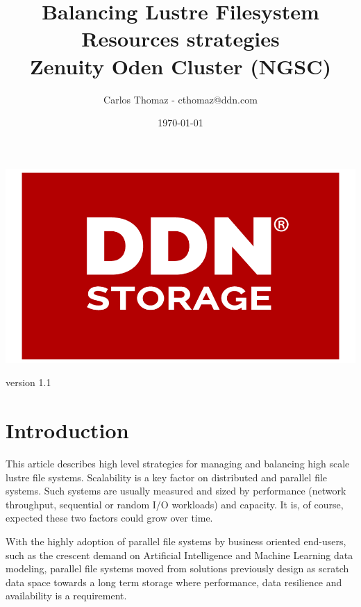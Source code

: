 \documentclass{article}
\title{%
Balancing Lustre Filesystem Resources strategies \\
\large Zenuity Oden Cluster (NGSC)}
\author{Carlos Thomaz - cthomaz@ddn.com}
\date{\today}
\begin{document}
\maketitle


\begin{center}
    \includegraphics[scale=0.14]{logo.png}\\[1cm] 
\end{center}
\begin{center}
    version 1.1
\end{center}
\newpage

\begin{versionhistory}

\end{versionhistory}
\newpage

\tableofcontents

\newpage
\section{Introduction}
This article describes high level strategies for managing and balancing high scale lustre file systems. Scalability is a key factor on distributed and parallel file systems. Such systems are usually measured and sized by performance (network throughput, sequential or random I/O workloads) and capacity. It is, of course, expected these two factors could grow over time.

With the highly adoption of parallel file systems by business oriented end-users, such as the crescent demand on Artificial Intelligence and Machine Learning data modeling, parallel file systems moved from solutions previously design as scratch data space towards a long term storage where performance, data resilience and availability is a requirement.
\end{document}
